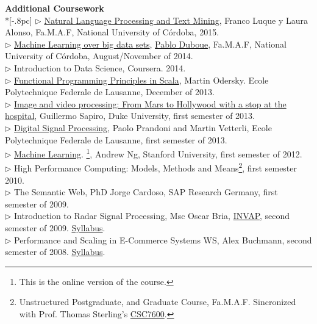\documentclass[letter,11pt,english]{article}
\begin{document}
{\large \bf Additional Coursework}\\ *[-.8pc]
\underline{\hspace{6in}}
$\triangleright$ \href{http://cs.famaf.unc.edu.ar/wiki/materias/pln}{Natural Language Processing and Text Mining}, Franco Luque y Laura Alonso, Fa.M.A.F, National University of C\'ordoba, 2015.\\
$\triangleright$ \href{http://aprendizajengrande.net/}{Machine Learning over big data sets},  \href{http://duboue.net/}{Pablo Duboue}, Fa.M.A.F, National University of C\'ordoba, August/November of 2014.\\
$\triangleright$ Introduction to Data Science, Coursera. 2014.\\
$\triangleright$ \href{https://www.coursera.org/course/progfun}{Functional Programming Principles in Scala},  Martin Odersky. Ecole Polytechnique Federale de Lausanne, December of 2013.  \\
$\triangleright$ \href{https://www.coursera.org/course/images}{Image and video processing: From Mars to Hollywood with a stop at the hospital}, Guillermo Sapiro, Duke University, first semester of 2013. \\
$\triangleright$ \href{https://www.coursera.org/course/dsp}{Digital Signal Processing}, Paolo Prandoni and Martin Vetterli, Ecole Polytechnique Federale de Lausanne, first semester of 2013.\\
$\triangleright$ \href{http://www.ml-class.org}{Machine Learning}. \footnote{This is the online version of the course.}, Andrew Ng, Stanford University, first semester of 2012. \\
$\triangleright$ High Performance Computing: Models, Methods and Means\footnote{Unstructured Postgraduate,
and Graduate Course, Fa.M.A.F. Sincronized with Prof. Thomas Sterling's 
\href{https://www.cct.lsu.edu/csc7600/Home.html}{CSC7600}.}, first semester 2010.\\
$\triangleright$ The Semantic Web, PhD Jorge Cardoso, SAP Research Germany, first semester of 2009.\\
$\triangleright$ Introduction to Radar Signal Processing, Msc Oscar Bria, 
\href{http://www.invap.net/index-e.php}{INVAP}, second semester of 2009. \href{http://postgrado.info.unlp.edu.ar/Cursos/Cursos/11-2011_Introduccion_al_Procesamiento_de_Senales_Radar.pdf}{Syllabus}.\\
$\triangleright$ Performance and Scaling in E-Commerce Systems WS, Alex Buchmann, second semester of 2008. 
\href{http://www.dvs.tu-darmstadt.de/teaching/perf/2008/}{Syllabus}.\\
\end{document}
